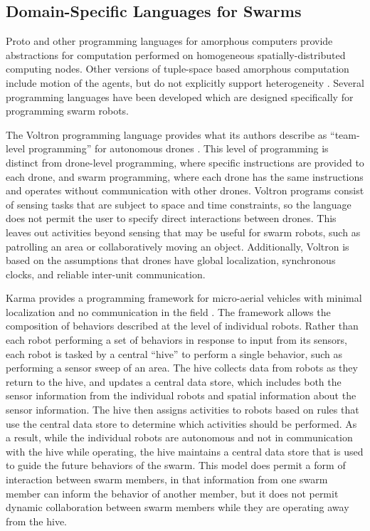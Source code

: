 \subsection{Domain-Specific Languages for Swarms} \label{section:Domain_Specific_Languages_for_Swarms}

Proto and other programming languages for amorphous computers provide abstractions for computation performed on homogeneous spatially-distributed computing nodes. 
Other versions of tuple-space based amorphous computation include motion of the agents, but do not explicitly support heterogeneity \citep{viroli2012linda}.
Several programming languages have been developed which are designed specifically for programming swarm robots.

The Voltron programming language provides what its authors describe as ``team-level programming'' for autonomous drones \citep{mottola2014team}.
This level of programming is distinct from drone-level programming, where specific instructions are provided to each drone, and swarm programming, where each drone has the same instructions and operates without communication with other drones.
Voltron programs consist of sensing tasks that are subject to space and time constraints, so the language does not permit the user to specify direct interactions between drones. 
This leaves out activities beyond sensing that may be useful for swarm robots, such as patrolling an area or collaboratively moving an object.
Additionally, Voltron is based on the assumptions that drones have global localization, synchronous clocks, and reliable inter-unit communication.   

Karma provides a programming framework for micro-aerial vehicles with minimal localization and no communication in the field \citep{dantu2011programming}.
The framework allows the composition of behaviors described at the level of individual robots. 
Rather than each robot performing a set of behaviors in response to input from its sensors, each robot is tasked by a central ``hive'' to perform a single behavior, such as performing a sensor sweep of an area. 
The hive collects data from robots as they return to the hive, and updates a central data store, which includes both the sensor information from the individual robots and spatial information about the sensor information. 
The hive then assigns activities to robots based on rules that use the central data store to determine which activities should be performed. 
As a result, while the individual robots are autonomous and not in communication with the hive while operating, the hive maintains a central data store that is used to guide the future behaviors of the swarm. 
This model does permit a form of interaction between swarm members, in that information from one swarm member can inform the behavior of another member, but it does not permit dynamic collaboration between swarm members while they are operating away from the hive. 

